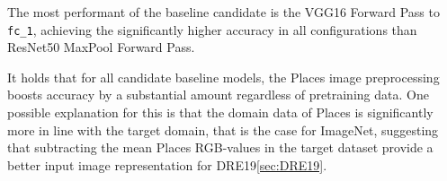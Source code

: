 The most performant of the baseline candidate is the VGG16 Forward Pass to \texttt{fc\_1}, achieving the significantly higher accuracy in all configurations than ResNet50 MaxPool Forward Pass. 

\begin{table}[H]
    \centering
\end{table}

It holds that for all candidate baseline models, the Places image preprocessing boosts accuracy by a substantial amount regardless of pretraining data.
One possible explanation for this is that the domain data of Places is significantly more in line with the target domain, that is the case for ImageNet, suggesting that subtracting the mean Places RGB-values in the target dataset provide a better input image representation for DRE19\ref{sec:DRE19}.
